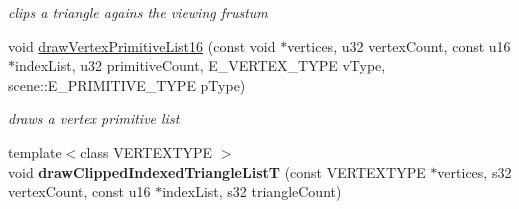 \begin{DoxyCompactItemize}
\begin{DoxyCompactList}\small\item\em clips a triangle agains the viewing frustum \end{DoxyCompactList}\item 
\hypertarget{classirr_1_1video_1_1_c_software_driver_a0fe54788b7635f73445f780cf6991af7}{void \hyperlink{classirr_1_1video_1_1_c_software_driver_a0fe54788b7635f73445f780cf6991af7}{draw\-Vertex\-Primitive\-List16} (const void $\ast$vertices, u32 vertex\-Count, const u16 $\ast$index\-List, u32 primitive\-Count, E\-\_\-\-V\-E\-R\-T\-E\-X\-\_\-\-T\-Y\-P\-E v\-Type, scene\-::\-E\-\_\-\-P\-R\-I\-M\-I\-T\-I\-V\-E\-\_\-\-T\-Y\-P\-E p\-Type)}\label{classirr_1_1video_1_1_c_software_driver_a0fe54788b7635f73445f780cf6991af7}

\begin{DoxyCompactList}\small\item\em draws a vertex primitive list \end{DoxyCompactList}\item 
\hypertarget{classirr_1_1video_1_1_c_software_driver_aa1cce639bda2a3c959a2c286a80800bd}{{\footnotesize template$<$class V\-E\-R\-T\-E\-X\-T\-Y\-P\-E $>$ }\\void {\bfseries draw\-Clipped\-Indexed\-Triangle\-List\-T} (const V\-E\-R\-T\-E\-X\-T\-Y\-P\-E $\ast$vertices, s32 vertex\-Count, const u16 $\ast$index\-List, s32 triangle\-Count)}\label{classirr_1_1video_1_1_c_software_driver_aa1cce639bda2a3c959a2c286a80800bd}

\end{DoxyCompactItemize}
